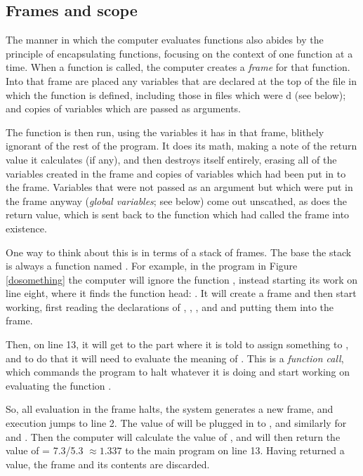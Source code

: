 \documentclass[12pt]{article}
\def\ind#1{\index{#1}#1}
\begin{document}
\subsection{Frames and scope}  
The manner in which the computer evaluates functions also abides by the
principle of encapsulating functions, focusing on the context of one
function at a time. When a function is called, the computer creates a
{\sl frame} for that function. Into that frame are placed any variables
that are declared at the top of the file in which the function is defined,
including those in files which were d (see below); and copies of
variables which are passed as arguments. 

The function is then run, using the variables it has in that frame,
blithely ignorant of the rest of the program. It does its math, making a
note of the return value it calculates (if any), and then destroys itself
entirely, erasing all of the variables created in the frame and copies
of variables which had been put in to the frame. Variables that were not
passed as an argument but which were put in the frame anyway ({\sl global
variables}; see below) come out unscathed, as does the return value, which
is sent back to the function which had called the frame into existence.

\lstset{numbers=left, numberstyle=\scshape}
\lstset{numbers=none}

One way to think about this is in terms of a \ind{stack} of frames. 
The base the stack is always a function named . 
For example, in the program in Figure \ref{dosomething} 
the computer will ignore the function
, instead starting its work on line eight, where it
finds the  function head: .  It will
create a  frame and
then start working, first reading the declarations of ,
, , and  and putting them
into the frame.

Then, on line 13, it will get to the part where it is told to
assign something to , and to do that it will need
to evaluate the meaning of . This is a {\em function call}, which commands the program
to halt whatever it is doing and start working on evaluating the
function . 

So, all evaluation in the  frame halts, 
the system generates a new frame, and execution jumps to 
line 2. The value of 
will be plugged in to , and similarly for  and
. Then the computer will calculate the value of , and will then return the value of  =
7.3/5.3 $\approx 1.337$ to the main program on line 13. Having returned
a value, the  frame and its contents are
discarded.
\end{document}
